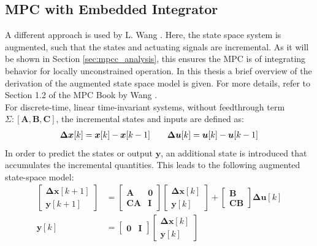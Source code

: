 \subsection{MPC with Embedded Integrator}\label{sec:mpcc_mpc_wang}
A different approach is used by L. Wang \cite{mpcWang}. Here, the state space system is augmented, such that the states and actuating signals are incremental. As it will be shown in Section \ref{sec:mpcc_analysis}, this ensures the MPC is of integrating behavior for locally unconstrained operation. In this thesis a brief overview of the derivation of the augmented state space model is given. For more details, refer to Section 1.2 of the MPC Book by Wang \cite{mpcWang}.\\
For discrete-time, linear time-invariant systems, without feedthrough term $\Sigma: \left[\bm{A}, \bm{B}, \bm{C} \right]$, the incremental states and inputs are defined as:
\begin{align*}
\bm{\Delta x}[k]  = {\bm{x}}[k] - {\bm{x}}[k-1] & \quad & \bm{\Delta u}[k] = \bm{u}[k] - \bm{u}[k-1] 
\end{align*}
In order to predict the states or output $\bm{y}$, an additional state is introduced that accumulates the incremental quantities. This leads to the following augmented state-space model:
\begin{equation}
	\begin{split}
			\begin{bmatrix}
				\bm{\Delta x}[k+1] \\
				\bm{y}[k+1]
			\end{bmatrix}
		&=
			\begin{bmatrix}
				\bm{A} & \bm{0} \\
				\bm{C}\bm{A} & \bm{I}
			\end{bmatrix}
			\begin{bmatrix}
				\bm{\Delta x}[k] \\
				\bm{y}[k]
			\end{bmatrix}
		+
			\begin{bmatrix}
				\bm{B} \\
				\bm{C}\bm{B}
			\end{bmatrix}
		\bm{\Delta u}[k]
		\\
		\bm{y}[k]
		&=
			\begin{bmatrix}
				\bm{0} & \bm{I}
			\end{bmatrix}
		\begin{bmatrix}
			\bm{\Delta x}[k] \\
			\bm{y}[k]
		\end{bmatrix}
	\end{split}
	\label{equ:2_augmented_wang}
\end{equation}

